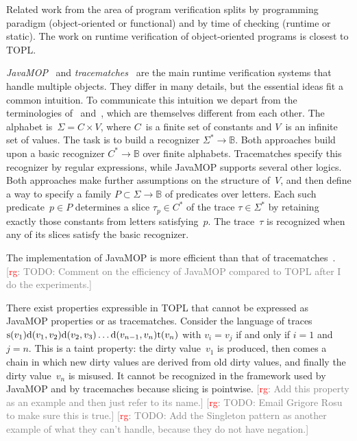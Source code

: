 \documentclass[9pt, preprint]{sigplanconf} %
\newcommand{\noterg}[2]{\textcolor{gray}{[\textcolor{red}{#1}: #2]}}
\newcommand{\rg}[1]{\noterg{rg}{#1}}
\newcommand{\B}{\ensuremath{\mathbb{B}}}
\theoremstyle{definition}
\theoremstyle{remark}
\begin{document}
Related work from the area of program verification splits by programming paradigm (object-oriented or functional) and by time of checking (runtime or static).
The work on runtime verification of object-oriented programs is closest to TOPL\null.

{\it JavaMOP\/}~\cite{dblp:journals/sttt/meredithjgcr12} and {\it tracematches\/}~\cite{dblp:conf/oopsla/allanachklmsst05} are the main runtime verification systems that handle multiple objects.
They differ in many details, but the essential ideas fit a common intuition.
To communicate this intuition we depart from the terminologies of \cite{dblp:journals/sttt/meredithjgcr12}~and~\cite{dblp:conf/oopsla/allanachklmsst05}, which are themselves different from each other.
The alphabet is~$\Sigma=C\times V$, where $C$~is a finite set of constants and $V$~is an infinite set of values.
The task is to build a recognizer $\Sigma^*\to\B$.
Both approaches build upon a basic recognizer $C^*\to\B$ over finite alphabets.
Tracematches specify this recognizer by regular expressions, while JavaMOP supports several other logics.
Both approaches make further assumptions on the structure of~$V$, and then define a way to specify a family $P\subset\Sigma\to\B$ of predicates over letters.
Each such predicate~$p\in P$ determines a slice $\tau_p\in C^*$ of the trace $\tau\in\Sigma^*$ by retaining exactly those constants from letters satisfying~$p$.
The trace~$\tau$ is recognized when any of its slices satisfy the basic recognizer.

The implementation of JavaMOP is more efficient than that of tracematches~\cite{dblp:journals/corr/abs-1112-5761}.
\rg{TODO: Comment on the efficiency of JavaMOP compared to TOPL after I do the experiments.}

There exist properties expressible in TOPL that cannot be expressed as JavaMOP properties or as tracematches.
Consider the language of traces
${\rm s}(v_1) {\rm d}(v_1,v_2){\rm d}(v_2,v_3)\ldots{\rm d}(v_{n-1},v_n){\rm t}(v_n)$
with $v_i=v_j$ if and only if $i=1$ and $j=n$.
This is a taint property: the dirty value~$v_1$ is produced, then comes a chain in which new dirty values are derived from old dirty values, and finally the dirty value~$v_n$ is misused.
It cannot be recognized in the framework used by JavaMOP and by tracemaches because slicing is pointwise.
\rg{Add this property as an example and then just refer to its name.}
\rg{TODO: Email Grigore Rosu to make sure this is true.}
\rg{TODO: Add the Singleton pattern as another example of what they can't handle, because they do not have negation.}
\end{document}
